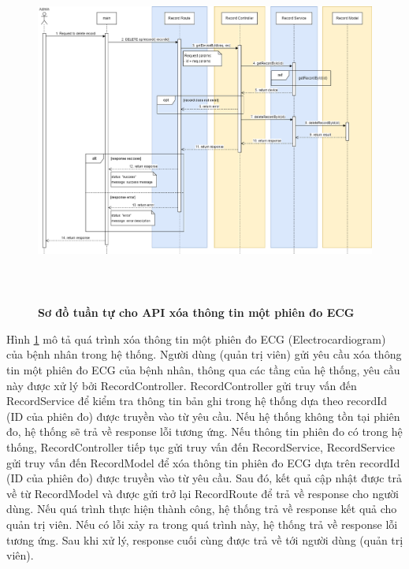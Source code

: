 \begin{figure}[H]
  \centering
  \includegraphics[width=16cm,height=11.5cm]{Images/sequence_api/deleteRecordById.png}
  \caption[Sơ đồ tuần tự cho API xóa thông tin một phiên đo ECG ]{\bfseries \fontsize{12pt}{0pt}
  \selectfont Sơ đồ tuần tự cho API xóa thông tin một phiên đo ECG }
  \label{deleteRecordById} %
\end{figure}
Hình \ref{deleteRecordById} mô tả quá trình xóa thông tin một phiên đo ECG (Electrocardiogram) của bệnh nhân trong hệ thống. Người dùng (quản trị viên) gửi yêu cầu xóa thông tin một phiên đo ECG của bệnh nhân, thông qua các tầng của hệ thống, 
yêu cầu này được xử lý bởi RecordController. RecordController gửi truy vấn đến RecordService để kiểm tra thông tin bản ghi trong hệ thống dựa theo recordId (ID của phiên đo) được truyền vào từ yêu cầu. Nếu hệ thống không tồn tại phiên đo, hệ thống sẽ trả về response lỗi tương ứng. 
Nếu thông tin phiên đo có trong hệ thống, RecordController tiếp tục gửi truy vấn đến RecordService, RecordService gửi truy vấn đến RecordModel để xóa thông tin phiên đo ECG dựa trên recordId (ID của phiên đo) được truyền vào từ yêu cầu. Sau đó, kết quả cập nhật được trả về từ RecordModel 
và được gửi trở lại RecordRoute để trả về response cho người dùng. Nếu quá trình thực hiện thành công, hệ thống trả về response kết quả cho quản trị viên. Nếu có lỗi xảy ra  trong quá trình này, hệ thống trả về response lỗi tương ứng. Sau khi xử lý, response cuối cùng được trả về tới người dùng (quản trị viên).


